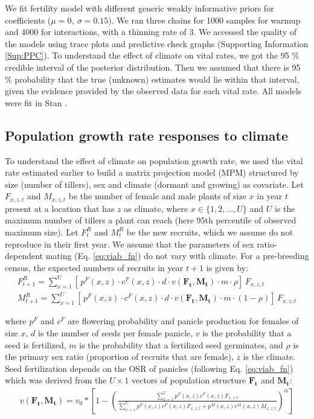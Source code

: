 \documentclass[12pt]{article}
\begin{document}
{\color{blue}We fit fertility model with different generic weakly informative priors for coefficients ($\mu = 0,\ \sigma = 0.15$).} 
We ran three chains for 1000 samples for warmup and 4000 for interactions, with a thinning rate of 3.
We accessed the quality of the models using trace plots and predictive check graphs \citep{piironen2017comparison} (Supporting Information \ref{Sup:PPC}).
To understand the effect of climate on vital rates, we got the 95 \% credible interval of the posterior distribution.  
Then we assumed that there is 95 \% probability that the true (unknown) estimates would lie within that interval, given the evidence provided by the observed data for each vital rate.
All models were fit in Stan \citep{rstan}. 

\subsection*{Population growth rate responses to climate}
To understand the effect of climate on population growth rate, we used the vital rate estimated earlier to build a matrix projection model (MPM) structured by size (number of tillers), sex and climate (dormant and growing) as covariate.  
Let $F_{x,z,t}$ and $M_{x,z,t}$ be the number of female and male plants of size $x$ in year $t$ present at a location that has $z$ as climate, where $x \in \{1,2,...,U\}$ and $U$ is the maximum number of tillers a plant can reach (here 95th percentile of observed maximum size).
Let $F^{R}_{t}$ and $M^{R}_{t}$ be the new recruits, which we assume do not reproduce in their first year.
We assume that the parameters of sex ratio-dependent mating (Eq. \ref{eq:viab_fn}) do not vary with climate.  
For a pre-breeding census, the expected numbers of recruits in year $t+1$ is given by:
\begin{align}\label{eq:recruits}
F^{R}_{t+1} = \sum_{x=1}^{U} 	[ \, p^{F}(x,z) \cdot c^{F}(x,z) \cdot d \cdot v(\mathbf{F_{t}},\mathbf{M_{t}}) \cdot m \cdot \rho 	] \, F_{x,z,t}
\\
M^{R}_{t+1} = \sum_{x=1}^{U} 	[ \, p^{F}(x,z) \cdot c^{F}(x,z) \cdot d \cdot v(\mathbf{F_{t}},\mathbf{M_{t}}) \cdot m \cdot (1-\rho) 	] \, F_{x,z,t}
\end{align}

\noindent where $p^{F}$ and $c^{F}$ are flowering probability and panicle production for females of size $x$, $d$ is the number of seeds per female panicle, $v$ is the probability that a seed is fertilized, $m$ is the probability that a fertilized seed germinates, and $\rho$ is the primary sex ratio (proportion of recruits that are female), $z$ is the climate. 
Seed fertilization depends on the OSR of panicles (following Eq. \ref{eq:viab_fn}) which was derived from the $U \times 1$ vectors of population structure $\mathbf{F_{t}}$ and $\mathbf{M_{t}}$:
\begin{align}\label{eq:viab_MPM}
v(\mathbf{F_{t}},\mathbf{M_{t}}) = v_{0} * \left[ 1 - \left( \frac{\sum_{x=1}^{U} p^{F}(x,z) c^{F}(x,z) F_{x,z,t}}{\sum_{x=1}^{U} p^{F}(x,z) c^{F}(x,z) F_{x,z,t} + p^{M}(x,z) c^{M}(x,z) M_{x,z,t}} \right) ^{\alpha}\right]
\end{align}
\end{document}
